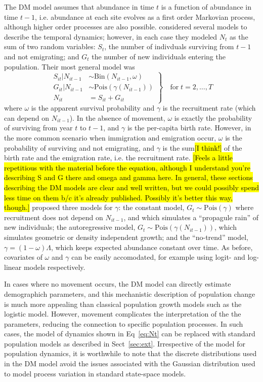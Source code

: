 \documentclass[12pt]{article}
\begin{document}
The DM model assumes that abundance in time $t$ is a function of
abundance in time $t-1$, i.e. abundance at each site evolves as a
first order Markovian process, although
higher order processes are also possible.  \citet{dail_madsen:2011}
considered several models to describe the temporal dynamics; however,
in each case they modeled $N_t$ as the sum of two random variables:
$S_t$, the number of indivduals surviving from $t-1$ and not
emigrating; and $G_t$ the number of new individuals entering the
population. Their most general model was
\begin{equation}
\left.\begin{aligned}
S_{it}|N_{it-1} &\sim \mathrm{Bin}(N_{it-1}, \omega) \\
G_{it}|N_{it-1} &\sim \mathrm{Pois}(\gamma(N_{it-1})) \\
N_{it} &= S_{it}+G_{it}
\end{aligned}\right\} \quad \text{for} \; t=2,\hdots,T
\label{eq:Nt}
\end{equation}
where $\omega$ is the apparent survival probability and $\gamma$ is
the recruitment rate (which can depend on $N_{it-1}$). In the absence
of movement, $\omega$ is exactly the probability of surviving from
year $t$ to $t-1$, and $\gamma$ is the per-capita birth rate. However,
in the more common scenario when immigration and emigration occur,
$\omega$ is the probability of surviving and not emigrating, and
$\gamma$ is the sum\hl{[I think!]} of the birth rate and the emigration rate,
i.e. the recruitment rate. \hl{[Feels a little repetitious with the material 
before the equation, although I understand you're describing S and G 
there and omega and gamma here.  In general, these sections 
describing the DM models are clear and well written, but we could 
possibly spend less time on them b/c it's already published.  
Possibly it's better this way, though.]} \citet{dail_madsen:2011} proposed three
models for $\gamma$: the constant model,
$G_t \sim \mathrm{Pois}(\gamma)$ where recruitment does not depend on
$N_{it-1}$, and which simulates a ``propagule rain'' of new individuals; the
autoregressive model, $G_t \sim \mathrm{Pois}(\gamma(N_{it-1}))$, which
simulates geometric or density independent growth; and the
``no-trend'' model, $\gamma = (1-\omega)\Lambda$, which keeps
expected abundance constant over time. As before, covariates of
$\omega$ and $\gamma$ can be easily accomodated, for example using
logit- and log-linear models respectively.

In cases where no movement occurs, the DM model can directly estimate
demographich parameters, and this mechanistic description of
population change is much more appealing than classical
population growth models such as the logistic model. However, movement
complicates the interpretation of the the parameters, reducing the
connection to specific population processes. In such cases, the model
of dynamics shown in Eq~\ref{eq:Nt} can be replaced with standard
population models as described in Sect~\ref{sec:ext}. Irrespective of
the model for population dynamics, it is worthwhile to note that the
discrete distributions used in the DM model avoid the issues
associated with the Gaussian distribution used to model process
variation in standard state-space models.
\end{document}
